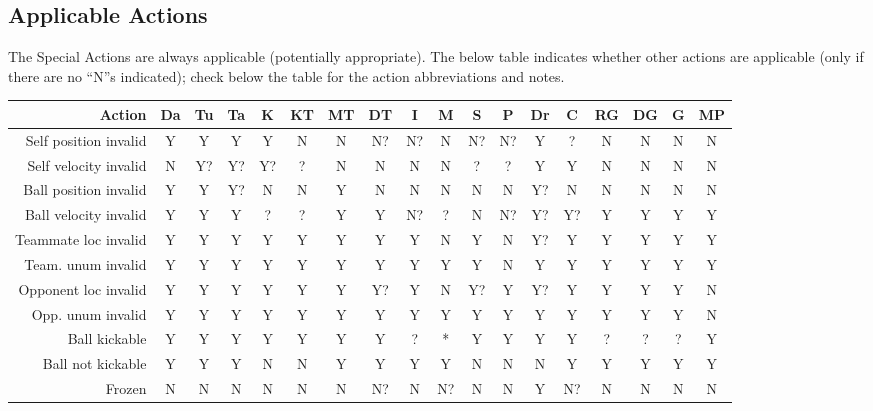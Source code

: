 \documentclass[12pt]{article}
\begin{document}
\subsection{Applicable Actions}
The Special Actions are always applicable (potentially appropriate). The below table indicates whether
other actions are applicable (only if there are no ``N''s indicated); check
below the table for the action abbreviations and notes.

\begin{center}
{\footnotesize
\begin{tabular}{r       | c    c      c    c   | c     c      c    c  | c    c    c     c     c     c     c     c     c}
Action                  & Da & Tu  &  Ta & K   & KT &  MT &  DT &  I  & M  & S  & P  &  Dr  & C  &  RG &  DG  & G  &  MP \\
\hline \hline
Self position invalid   & Y  &  Y  &  Y  &  Y  & N  &  N  &  N? &  N? & N  & N? & N? &  Y   & ?  &  N  &  N   & N  &  N \\
Self velocity invalid   & N  &  Y? &  Y? &  Y? & ?  &  N  &  N  &  N  & N  & ?  & ?  &  Y   & Y  &  N  &  N   & N  &  N \\
Ball position invalid   & Y  &  Y  &  Y? &  N  & N  &  Y  &  N  &  N  & N  & N  & N  &  Y?  & N  &  N  &  N   & N  &  N \\
Ball velocity invalid   & Y  &  Y  &  Y  &  ?  & ?  &  Y  &  Y  &  N? & ?  & N  & N? &  Y?  & Y? &  Y  &  Y   & Y  &  Y \\
Teammate loc invalid    & Y  &  Y  &  Y  &  Y  & Y  &  Y  &  Y  &  Y  & N  & Y  & N  &  Y?  & Y  &  Y  &  Y   & Y  &  Y \\
Team. unum invalid      & Y  &  Y  &  Y  &  Y  & Y  &  Y  &  Y  &  Y  & Y  & Y  & N  &  Y   & Y  &  Y  &  Y   & Y  &  Y \\
Opponent loc invalid    & Y  &  Y  &  Y  &  Y  & Y  &  Y  &  Y? &  Y  & N  & Y? & Y  &  Y?  & Y  &  Y  &  Y   & Y  &  N \\
Opp. unum invalid       & Y  &  Y  &  Y  &  Y  & Y  &  Y  &  Y  &  Y  & Y  & Y  & Y  &  Y   & Y  &  Y  &  Y   & Y  &  N \\
\hline
Ball kickable           & Y  &  Y  &  Y  &  Y  & Y  &  Y  &  Y  &  ?  & *  & Y  & Y  &  Y   & Y  &  ?  &  ?   & ?  &  Y \\
Ball not kickable       & Y  &  Y  &  Y  &  N  & N  &  Y  &  Y  &  Y  & Y  & N  & N  &  N   & Y  &  Y  &  Y   & Y  &  Y \\
\hline
Frozen                  & N  &  N  &  N  &  N  & N  &  N  &  N? &  N  & N? & N  & N  &  Y   & N? &  N  &  N   & N  &  N \\

\end{tabular}}
\end{center}
\end{document}
